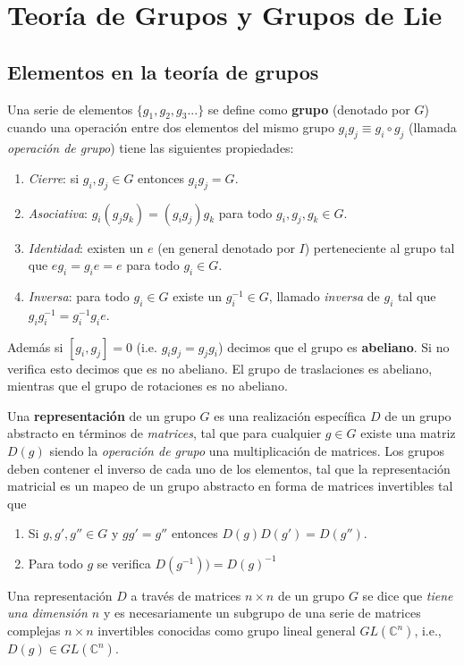 
\chapter{Teoría de Grupos y Grupos de Lie}  \label{Ch:B}

\section{Elementos en la teoría de grupos}

\begin{definicion}
	Una serie de elementos $\{g_1,g_2,g_3...\}$ se define como \textbf{grupo} (denotado por $G$) cuando una operación entre dos elementos del mismo grupo $g_i g_j \equiv g_i \circ g_j$ (llamada \textit{operación de grupo}) tiene las siguientes propiedades:
	\begin{enumerate}[label=\alph*)]
		\item \textit{Cierre}: si $g_i,g_j \in G$ entonces $g_ig_j=G$. 
		\item \textit{Asociativa}: $g_i(g_jg_k)=(g_ig_j)g_k$ para todo $ g_i, g_j, g_k \in G$.
		\item \textit{Identidad}: existen un $e$ (en general denotado por $I$) perteneciente al grupo tal que $eg_i=g_ie=e$ para todo $g_i\in G$.  
		\item \textit{Inversa}: para todo $g_i\in G$ existe un $g_i^{-1}\in G$, llamado \textit{inversa} de $g_i$ tal que $g_ig^{-1}_i =g_i^{-1}g_i e$.
	\end{enumerate}
	Además si $[g_i,g_j] = 0$ (i.e. $g_ig_j=g_jg_i$) decimos que el grupo es \textbf{abeliano}. Si no verifica esto decimos que es no abeliano. El grupo de traslaciones es abeliano, mientras que el grupo de rotaciones es no abeliano. 
\end{definicion}

Una \textbf{representación} de un grupo $G$ es una realización específica $D$ de un grupo abstracto en términos de \textit{matrices}, tal que para cualquier $g\in G$ existe una matriz $D(g)$ siendo la \textit{operación de grupo} una multiplicación de matrices. Los grupos deben contener el inverso de cada uno de los elementos, tal que la representación matricial es un mapeo de un grupo abstracto en forma de matrices invertibles tal que

\begin{enumerate}[label=\alph*)]
	\item Si $g,g',g''\in G$ y $gg'=g''$ entonces $D(g)D(g')=D(g'')$.
	\item Para todo $g$ se verifica $D(g^{-1}))=D(g)^{-1}$
\end{enumerate} 
Una representación $D$ a través de matrices $n\times n$ de un grupo $G$ se dice que \textit{tiene una dimensión $n$} y es necesariamente un subgrupo de una serie de matrices complejas $n\times n$ invertibles conocidas como grupo lineal general $GL(\mathbb{C}^n)$, i.e., $D(g) \in GL(\mathbb{C}^n)$.

